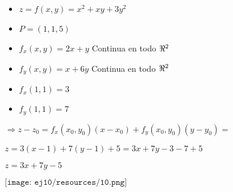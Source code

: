 \documentclass[../practica_04.tex]{subfiles}
\begin{document}
    \begin{itemize}
        \item $ z = f(x,y) = x^2 + xy + 3y^2$
        \item $ P = (1,1,5)$
        \item $ f_x(x,y) = 2x + y$ Continua en todo $\real^2$
        \item $ f_y(x,y) = x + 6y$ Continua en todo $\real^2$
        \item $ f_x(1,1) = 3$
        \item $ f_y(1,1) = 7$
    \end{itemize}

    $ \Rightarrow z - z_0 = f_x(x_0,y_0)(x - x_0) + f_y(x_0,y_0)(y-y_0) =$

    $ z = 3(x-1) + 7(y-1) + 5 = 3x + 7y - 3 - 7 + 5$

    $ z = 3x + 7y - 5 $

    $ \texttt{[image: ej10/resources/10.png]}  $
\end{document}
